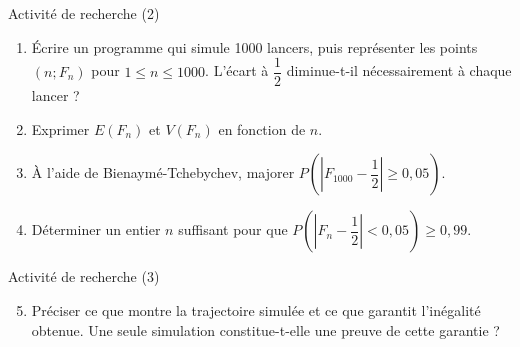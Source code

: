 \documentclass[aspectratio=169,10pt]{beamer}
\begin{document}
\begin{frame}{Activité de recherche (2)}
\begin{enumerate}
\setcounter{enumi}{0}\item Écrire un programme qui simule 1000 lancers, puis représenter les points \((n;F_n)\) pour \(1\le n\le1000\). L'écart à \(\dfrac12\) diminue-t-il nécessairement à chaque lancer ?

\item Exprimer \(E(F_n)\) et \(V(F_n)\) en fonction de \(n\).

\item À l'aide de Bienaymé-Tchebychev, majorer \(P(|F_{1000}-\dfrac12|\ge0{,}05)\).

\item Déterminer un entier \(n\) suffisant pour que \(P(|F_n-\dfrac12|<0{,}05)\ge0{,}99\).

\end{enumerate}
\end{frame}
\begin{frame}{Activité de recherche (3)}
\begin{enumerate}
\setcounter{enumi}{4}\item Préciser ce que montre la trajectoire simulée et ce que garantit l'inégalité obtenue. Une seule simulation constitue-t-elle une preuve de cette garantie ?

\end{enumerate}
\end{frame}
\end{document}
